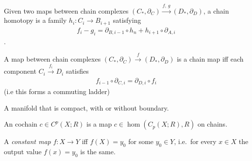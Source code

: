 \begin{definition}

Given two maps between chain complexes
\((C_*, {\partial}_{C}) \xrightarrow{f, ~g} (D_*, {\partial}_{D})\), a
chain homotopy is a family \(h_{i}: C_{i} \to B_{i+1}\) satisfying
\begin{align*}f_{i}-g_{i} = {\partial}_{B, i-1}\circ h_{n} + h_{i+1}\circ {\partial}_{A, i}\end{align*}
.

\end{definition}

\begin{definition}

A map between chain complexes
\((C_*, {\partial}_{C}) \xrightarrow{f} (D_*, {\partial}_{D})\) is a
chain map iff each component \(C_{i} \xrightarrow{f_{i}} D_{i}\)
satisfies
\begin{align*}
f_{i-1}\circ{\partial}_{C, i} = {\partial}_{D,i} \circ f_{i}
\end{align*}
(i.e this forms a commuting ladder)

\end{definition}

\begin{definition}

A manifold that is compact, with or without boundary.

\end{definition}

\begin{definition}[Coboundary]

\end{definition}


\begin{definition}[Cochain]

An cochain \(c \in C^p(X; R)\) is a map \(c \in \hom(C_{p}(X; R), R)\)
on chains.

\end{definition}

\begin{definition}[Cocycle]

\end{definition}


\begin{definition}

A \emph{constant map} \(f: X\to Y\) iff \(f(X) = y_{0}\) for some
\(y_{0}\in Y\), i.e.~for every \(x\in X\) the output value
\(f(x) = y_{0}\) is the same.

\end{definition}

